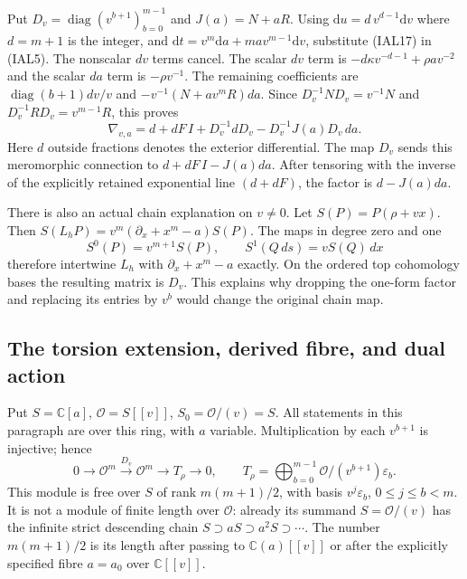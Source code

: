 \documentclass[11pt,a4paper]{article}
\theoremstyle{definition}
\begin{document}
Put $D_v=\operatorname{diag}(v^{b+1})_{b=0}^{m-1}$ and $J(a)=N+aR$.
Using $\mathrm d u=d\,v^{d-1}\mathrm d v$ where $d=m+1$ is the integer,
and $\mathrm d t=v^m\mathrm d a+ma v^{m-1}\mathrm d v$,
substitute (IAL17) in (IAL5).
The nonscalar $dv$ terms cancel.  The scalar $dv$ term is
$-d\kappa v^{-d-1}+\rho a v^{-2}$ and the scalar $da$ term is
$-\rho v^{-1}$.  The remaining coefficients are
$\operatorname{diag}(b+1)dv/v$ and $-v^{-1}(N+av^mR)da$.
Since $D_v^{-1}ND_v=v^{-1}N$ and
$D_v^{-1}RD_v=v^{m-1}R$, this proves
\begin{equation}
 \nabla_{v,a}=d+dF\,I+D_v^{-1}dD_v
                  -D_v^{-1}J(a)D_v\,da.             \tag{IAL18}
\end{equation}
Here $d$ outside fractions denotes the exterior differential.  The
map $D_v$ sends this meromorphic connection to
$d+dF\,I-J(a)da$.  After tensoring with the inverse of the explicitly
retained exponential line $(d+dF)$, the factor is $d-J(a)da$.

There is also an actual chain explanation on $v\ne0$.
Let $S(P)=P(\rho+vx)$.  Then
$S(L_hP)=v^m(\partial_x+x^m-a)S(P)$.
The maps in degree zero and one
\begin{equation}
 S^0(P)=v^{m+1}S(P),\qquad
 S^1(Q\,ds)=vS(Q)\,dx                              \tag{IAL19}
\end{equation}
therefore intertwine $L_h$ with $\partial_x+x^m-a$ exactly.  On the
ordered top cohomology bases the resulting matrix is $D_v$.
This explains why dropping the one-form factor and replacing its
entries by $v^b$ would change the original chain map.

\subsection{The torsion extension, derived fibre, and dual action}
Put $S=\mathbb C[a]$, $\mathcal O=S[[v]]$, $S_0=\mathcal O/(v)=S$.
All statements in this paragraph are over this ring, with $a$ variable.
Multiplication by each $v^{b+1}$ is injective; hence
\begin{equation}
 0\longrightarrow\mathcal O^m\xrightarrow{D_v}\mathcal O^m
 \longrightarrow T_\rho\longrightarrow0,\qquad
 T_\rho=\bigoplus_{b=0}^{m-1}\mathcal O/(v^{b+1})\varepsilon_b.
                                                        \tag{IAL20}
\end{equation}
This module is free over $S$ of rank $m(m+1)/2$, with basis
$v^j\varepsilon_b$, $0\leq j\leq b<m$.  It is not a module of finite
length over $\mathcal O$: already its summand $S=\mathcal O/(v)$ has
the infinite strict descending chain $S\supset aS\supset a^2S\supset\cdots$.
The number $m(m+1)/2$ is its length after passing to $\mathbb C(a)[[v]]$
or after the explicitly specified fibre $a=a_0$ over $\mathbb C[[v]]$.
\end{document}
